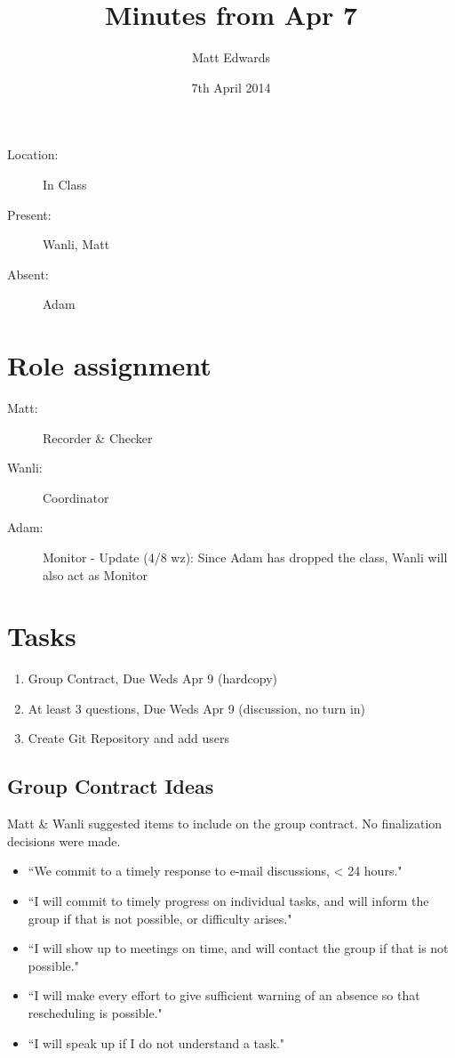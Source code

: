 \documentclass{article}
\title{Minutes from Apr 7}
\author{Matt Edwards}
\date{7th April 2014}
\begin{document}
\maketitle

\begin{description}
\item[Location:] In Class
\item[Present:] Wanli, Matt
\item[Absent:] Adam
\end{description}

\section{Role assignment}
\begin{description}
\item[Matt:]Recorder \& Checker
\item[Wanli:]Coordinator
\item[Adam:]Monitor - Update (4/8 wz): Since Adam has dropped the class, Wanli will also act as Monitor
\end{description}

\section{Tasks}
\begin{enumerate}
\item Group Contract, Due Weds Apr 9 (hardcopy)
\item At least 3 questions, Due Weds Apr 9 (discussion, no turn in)
\item Create Git Repository and add users
\end{enumerate}

\subsection{Group Contract Ideas}
Matt \& Wanli suggested items to include on the group contract. No finalization decisions were made.

\begin{itemize}
\item ``We commit to a timely response to e-mail discussions, < 24 hours."
\item ``I will commit to timely progress on individual tasks, and will inform the group if that is not possible, or difficulty arises."
\item ``I will show up to meetings on time, and will contact the group if that is not possible."
\item ``I will make every effort to give sufficient warning of an absence so that rescheduling is possible."
\item ``I will speak up if I do not understand a task."
\end{itemize}
\end{document}
